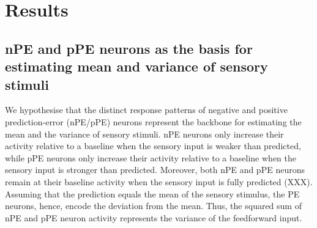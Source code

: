 \documentclass[10pt,a4paper,draft]{article}
\begin{document}
\section*{Results}
%

\subsection*{nPE and pPE neurons as the basis for estimating mean and variance of sensory stimuli}
%
We hypothesise that the distinct response patterns of negative and positive prediction-error (nPE/pPE) neurons represent the backbone for estimating the mean and the variance of sensory stimuli. nPE neurons only increase their activity relative to a baseline when the sensory input is weaker than predicted, while pPE neurons only increase their activity relative to a baseline when the sensory input is stronger than predicted. Moreover, both nPE and pPE neurons remain at their baseline activity when the sensory input is fully predicted (XXX). Assuming that the prediction equals the mean of the sensory stimulus, the PE neurons, hence, encode the deviation from the mean. Thus, the squared sum of nPE and pPE neuron activity represents the variance of the feedforward input. 
%
\end{document}
